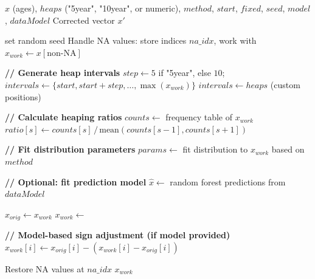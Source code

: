 \documentclass[pdflatex,sn-mathphys-num]{sn-jnl}%
\theoremstyle{thmstyleone}%
\theoremstyle{thmstyletwo}%
\theoremstyle{thmstylethree}%
\begin{document}
\begin{algorithm}
\small
\caption{Correct Heaping (Main Procedure)}\label{alg:correctHeaps}
\begin{algorithmic}[1]
\Require $x$ (ages), $heaps$ ("5year", "10year", or numeric), $method$, $start$, $fixed$, $seed$, $model$, $dataModel$
\Ensure Corrected vector $x'$

 set random seed \EndIf
\State Handle NA values: store indices $na\_idx$, work with $x_{work} \gets x[\text{non-NA}]$

\State \textbf{// Generate heap intervals}
    \State $step \gets 5$ if "5year", else $10$; \quad $intervals \gets \{start, start{+}step, \ldots, \max(x_{work})\}$
\Else
    \State $intervals \gets heaps$ (custom positions)
\EndIf

\State \textbf{// Calculate heaping ratios}
\State $counts \gets$ frequency table of $x_{work}$
    \State $ratio[s] \gets counts[s] \,/\, \text{mean}(counts[s{-}1], counts[s{+}1])$
\EndFor

\State \textbf{// Fit distribution parameters}
\State $params \gets$ fit distribution to $x_{work}$ based on $method$

\State \textbf{// Optional: fit prediction model}
    \State $\hat{x} \gets$ random forest predictions from $dataModel$
\EndIf

\State $x_{orig} \gets x_{work}$
    \State $x_{work} \gets$ 
\EndFor

\State \textbf{// Model-based sign adjustment (if model provided)}
        \State $x_{work}[i] \gets x_{orig}[i] - (x_{work}[i] - x_{orig}[i])$ 
    \EndIf
\EndFor

\State Restore NA values at $na\_idx$
\State \Return $x_{work}$
\end{algorithmic}
\end{algorithm}
\end{document}
